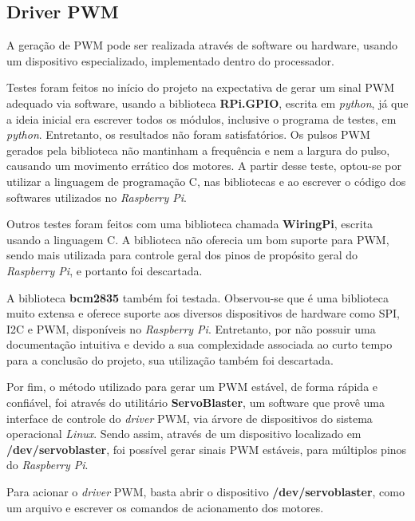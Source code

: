 \subsection{Driver PWM}
\label{subsec:deiverpwm}

A geração de PWM pode ser realizada através de software ou hardware, usando um dispositivo especializado, implementado dentro do processador.\par

Testes foram feitos no início do projeto na expectativa de gerar um sinal PWM adequado via software, usando a biblioteca \textbf{RPi.GPIO}, escrita em \textit{python}, já que a ideia inicial era escrever todos os módulos, inclusive o programa de testes, em \textit{python}. Entretanto, os resultados não foram satisfatórios. Os pulsos PWM gerados pela biblioteca não mantinham a frequência e nem a largura do pulso, causando um movimento errático dos motores. A partir desse teste, optou-se por utilizar a linguagem de programação C, nas bibliotecas e ao escrever o código dos softwares utilizados no \textit{Raspberry Pi}.\par

Outros testes foram feitos com uma biblioteca chamada \textbf{WiringPi}, escrita usando a linguagem C. A biblioteca não oferecia um bom suporte para PWM, sendo mais utilizada para controle geral dos pinos de propósito geral do \textit{Raspberry Pi}, e portanto foi descartada.\par

A biblioteca \textbf{bcm2835} também foi testada. Observou-se que é uma biblioteca muito extensa e oferece suporte aos diversos dispositivos de hardware como SPI, I2C e PWM, disponíveis no \textit{Raspberry Pi}. Entretanto, por não possuir uma documentação intuitiva e devido a sua complexidade associada ao curto tempo para a conclusão do projeto, sua utilização também foi descartada.\par

Por fim, o método utilizado para gerar um PWM estável, de forma rápida e confiável, foi através do utilitário \textbf{ServoBlaster}, um software que provê uma interface de controle do \textit{driver} PWM, via árvore de dispositivos do sistema operacional \textit{Linux}. Sendo assim, através de um dispositivo localizado em \textbf{/dev/servoblaster}, foi possível gerar sinais PWM estáveis, para múltiplos pinos do \textit{Raspberry Pi}.\par 

Para acionar o \textit{driver} PWM, basta abrir o dispositivo \textbf{/dev/servoblaster}, como um arquivo e escrever os comandos de acionamento dos motores.\par

